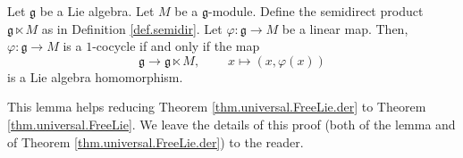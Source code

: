 \documentclass[etingof-lie.tex]{subfiles}
\begin{document}
\begin{lemma}
\label{lem.semidir.coc-to-deriv}Let $\mathfrak{g}$ be a Lie algebra. Let $M$
be a $\mathfrak{g}$-module. Define the semidirect product $\mathfrak{g}\ltimes
M$ as in Definition \ref{def.semidir}. Let $\varphi:\mathfrak{g}\rightarrow M$
be a linear map. Then, $\varphi:\mathfrak{g}\rightarrow M$ is a $1$-cocycle if
and only if the map%
\[
\mathfrak{g}\rightarrow\mathfrak{g}\ltimes M,\ \ \ \ \ \ \ \ \ \ x\mapsto
\left(  x,\varphi\left(  x\right)  \right)
\]
is a Lie algebra homomorphism.
\end{lemma}

\begin{vershort}
This lemma helps reducing Theorem \ref{thm.universal.FreeLie.der} to Theorem
\ref{thm.universal.FreeLie}. We leave the details of this proof (both of the
lemma and of Theorem \ref{thm.universal.FreeLie.der}) to the reader.
\end{vershort}
\end{document}
